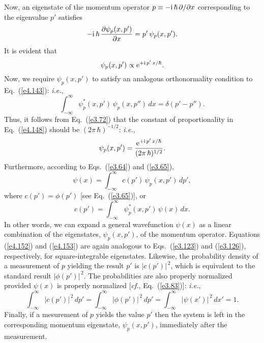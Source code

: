 Now, an eigenstate of the momentum operator $p\equiv -{\rm i}\,\hbar\,\partial/\partial x$ corresponding to the eigenvalue $p'$ satisfies
\begin{equation}
-{\rm i}\,\hbar\,\frac{\partial \psi_p(x,p')}{\partial x} = p'\,\psi_p(x,p').
\end{equation}
It is evident that
\begin{equation}\label{e4.148}
\psi_p(x,p') \propto {\rm e}^{+{\rm i}\,p'\,x/\hbar}.
\end{equation}
Now, we require $\psi_p(x,p')$ to satisfy an analogous orthonormality condition
to Eq.~(\ref{e4.143}): {\em i.e.}, 
\begin{equation}
\int_{-\infty}^\infty \psi_p^\ast(x,p')\,\psi_p(x,p'')\,dx = \delta(p'-p'').
\end{equation}
Thus, it follows from Eq.~(\ref{e3.72}) that the constant of proportionality
in Eq.~(\ref{e4.148}) should be $(2\pi\,\hbar)^{-1/2}$: {\em i.e.}, 
\begin{equation}\label{e4.148a}
\psi_p(x,p') =\frac{ {\rm e}^{+{\rm i}\,p'\,x/\hbar}}{(2\pi\,\hbar)^{1/2}}.
\end{equation}
Furthermore, according to Eqs.~(\ref{e3.64}) and (\ref{e3.65}),
\begin{equation}\label{e4.152}
\psi(x) = \int_{-\infty}^\infty c(p')\,\psi_p(x,p')\,dp',
\end{equation}
where $c(p') = \phi(p')$ [see Eq.~(\ref{e3.65})], or
\begin{equation}\label{e4.153}
c(p') = \int_{-\infty}^\infty \psi_p^\ast(x,p')\,\psi(x)\,dx.
\end{equation}
In other words, we can expand a general wavefunction $\psi(x)$
as a linear combination of the eigenstates, $\psi_p(x,p')$, of the
momentum operator. Equations (\ref{e4.152}) and (\ref{e4.153})
are again analogous to Eqs.~(\ref{e3.123}) and (\ref{e3.126}), respectively, 
for square-integrable eigenstates. Likewise, the probability density
of a measurement of $p$ yielding the result $p'$ is $|c(p')|^{\,2}$, which is equivalent to the standard result $|\phi(p')|^{\,2}$. The probabilities are also properly
normalized provided $\psi(x)$ is properly normalized [{\em cf.}, Eq.~(\ref{e3.83})]:
{\em i.e.}, 
\begin{equation}
\int_{-\infty}^\infty |c(p')|^{\,2}\,dp'= \int_{-\infty}^{\infty}
|\phi(p')|^{\,2}\,dp' = \int_{-\infty}^\infty |\psi(x')|^{\,2}\,dx' =1.
\end{equation}
Finally, if a mesurement of $p$ yields the value $p'$ then the system
is left in the corresponding momentum eigenstate, $\psi_p(x,p')$, immediately after the measurement.

